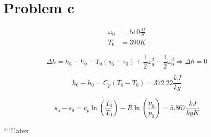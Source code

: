 \section*{Problem c}

\begin{align*}
    \omega_0 &= 510 \frac{M}{S} \\
    T_0 &= 390 K
\end{align*}

\[
\Delta h = h_6 - h_0 - T_0 (s_6 - s_0) + \frac{1}{2} \omega_6^2 - \frac{1}{2} \omega_0^2 \Rightarrow \Delta h = 0
\]

\[
h_6 - h_0 = C_p (T_6 - T_0) = 372.22 \frac{kJ}{kg}
\]

\[
s_6 - s_0 = c_p \ln \left( \frac{T_6}{T_0} \right) - R \ln \left( \frac{p_6}{p_0} \right) = 5.867 \frac{kJ}{kgK}
\]

``````latex